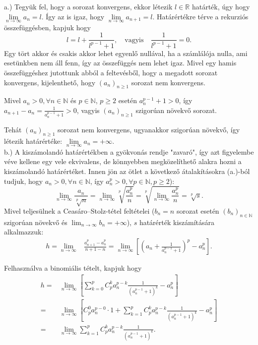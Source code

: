 \begin{solution}
a.) Tegyük fel, hogy a sorozat konvergens, ekkor létezik $l\in\mathbb{R}$
határték, úgy hogy $\lim\limits_{n\to\infty}{a_{n}}=l$. Így az is
igaz, hogy $\lim\limits_{n\to\infty}{a_{n+1}}=l$. Határértékre térve
a rekurziós összefüggésben, kapjuk hogy 
\[
l=l+\frac{1}{l^{p-1}+1},\quad\text{vagyis}\quad\frac{1}{l^{p-1}+1}=0.
\]
Egy tört akkor és csakis akkor lehet egyenlő nullával, ha a számlálója
nulla, ami esetünkben nem áll fenn, így az összefüggés nem lehet igaz.
Mivel egy hamis összefüggéshez jutottunk abból a feltevésből, hogy
a megadott sorozat konvergens, kijelenthető, hogy $(a_{n})_{n\geq1}$
sorozat nem konvergens.

Mivel $a_{n}>0,\forall n\in\mathbb{N}$ és $p\in\mathbb{N}$, $p\geq2$
esetén $a_{n}^{p-1}+1>0$, így $a_{n+1}-a_{n}=\frac{1}{a_{n}^{p-1}+1}>0$,
vagyis $(a_{n})_{n\geq1}$ szigorúan növekvő sorozat.

Tehát $(a_{n})_{n\geq1}$ sorozat nem konvergens, ugyanakkor szigorúan
növekvő, így létezik határértéke: $\lim\limits_{n\to\infty}{a_{n}}=+\infty.$\\
 b.) A kiszámolandó határértékben a gyökvonás rendje "zavaró", így
azt figyelembe véve kellene egy vele ekvivalens, de könnyebben megközelíthető
alakra hozni a kiszámolandó határértéket. Innen jön az ötlet a következő
átalakításokra (a.)-ból tudjuk, hogy $a_{n}>0,\forall n\in\mathbb{N}$,
így $a_{n}^{p}>0,\forall p\in\mathbb{N},p\geq2$): 
\[
\lim_{n\rightarrow\infty}\frac{a_{n}}{\sqrt[p]{n}}=\lim_{n\rightarrow\infty}\sqrt[p]{\frac{a_{n}^{p}}{n}}=\sqrt[p]{\lim_{n\rightarrow\infty}\frac{a_{n}^{p}}{n}}=\sqrt[p]{s}.
\]
Mivel teljesülnek a Ceasáro--Stolz-tétel feltételei ($b_{n}=n$ sorozat
esetén $(b_{n})_{n\in\mathbb{N}}$ szigorúan növekvő és $\lim_{n\rightarrow\infty}b_{n}=+\infty$),
$s$ határérték kiszámítására alkalmazzuk: 
\[
\begin{aligned}h=\lim_{n\rightarrow\infty} & \frac{a_{n+1}^{p}-a_{n}^{p}}{n+1-n}=\lim_{n\rightarrow\infty}\left[\left(a_{n}+\frac{1}{a_{n}^{p-1}+1}\right)^{p}-a_{n}^{p}\right].\end{aligned}
\]

\vspace{2mm}
 Felhasználva a binomiális tételt, kapjuk hogy 
\[
\begin{aligned}h= & \lim_{n\rightarrow\infty}\left[\sum_{k=0}^{p}C_{p}^{k}a_{n}^{p-k}\frac{1}{\left(a_{n}^{p-1}+1\right)^{k}}-a_{n}^{p}\right]\\
= & \lim_{n\rightarrow\infty}\left[C_{p}^{0}a_{n}^{p-0}\cdot1+\sum_{k=1}^{p}C_{p}^{k}a_{n}^{p-k}\frac{1}{\left(a_{n}^{p-1}+1\right)^{k}}-a_{n}^{p}\right]\\
= & \lim_{n\rightarrow\infty}\sum_{k=1}^{p}C_{p}^{k}a_{n}^{p-k}\frac{1}{\left(a_{n}^{p-1}+1\right)^{k}}.
\end{aligned}
\]


\end{solution}
